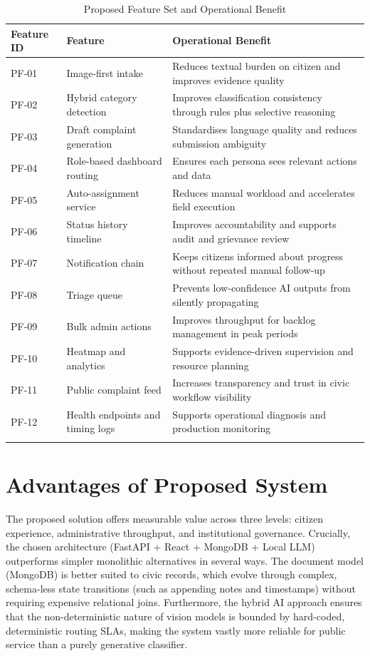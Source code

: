 \begin{xltabular}{\textwidth}{|>{\RaggedRight\arraybackslash}p{0.12\textwidth}|>{\RaggedRight\arraybackslash}p{0.30\textwidth}|>{\RaggedRight\arraybackslash}X|}
\hline
\textbf{Feature ID} & \textbf{Feature} & \textbf{Operational Benefit} \\ \hline
\endhead
PF-01 & Image-first intake & Reduces textual burden on citizen and improves evidence quality \\ \hline
PF-02 & Hybrid category detection & Improves classification consistency through rules plus selective reasoning \\ \hline
PF-03 & Draft complaint generation & Standardises language quality and reduces submission ambiguity \\ \hline
PF-04 & Role-based dashboard routing & Ensures each persona sees relevant actions and data \\ \hline
PF-05 & Auto-assignment service & Reduces manual workload and accelerates field execution \\ \hline
PF-06 & Status history timeline & Improves accountability and supports audit and grievance review \\ \hline
PF-07 & Notification chain & Keeps citizens informed about progress without repeated manual follow-up \\ \hline
PF-08 & Triage queue & Prevents low-confidence AI outputs from silently propagating \\ \hline
PF-09 & Bulk admin actions & Improves throughput for backlog management in peak periods \\ \hline
PF-10 & Heatmap and analytics & Supports evidence-driven supervision and resource planning \\ \hline
PF-11 & Public complaint feed & Increases transparency and trust in civic workflow visibility \\ \hline
PF-12 & Health endpoints and timing logs & Supports operational diagnosis and production monitoring \\ \hline
\caption{Proposed Feature Set and Operational Benefit}
\end{xltabular}

\section{Advantages of Proposed System}

The proposed solution offers measurable value across three levels: citizen experience, administrative throughput, and institutional governance. Crucially, the chosen architecture (FastAPI + React + MongoDB + Local LLM) outperforms simpler monolithic alternatives in several ways. The document model (MongoDB) is better suited to civic records, which evolve through complex, schema-less state transitions (such as appending notes and timestamps) without requiring expensive relational joins. Furthermore, the hybrid AI approach ensures that the non-deterministic nature of vision models is bounded by hard-coded, deterministic routing SLAs, making the system vastly more reliable for public service than a purely generative classifier.

